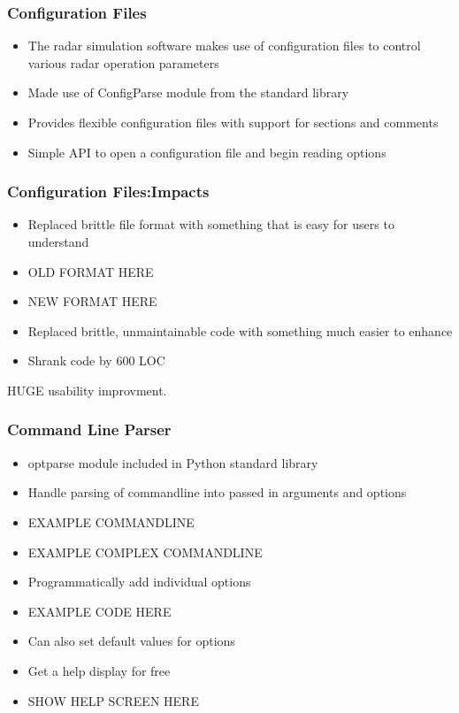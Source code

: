 \documentclass[red, hyperref={pdfpagelabels=false}]{beamer}
\begin{document}
\begin{frame}
  \frametitle{Configuration Files}
  \begin{itemize}
    \item The radar simulation software makes use of configuration files to
      control various radar operation parameters
    \item Made use of ConfigParse module from the standard library
    \item Provides flexible configuration files with support for sections and comments
    \item Simple API to open a configuration file and begin reading options
  \end{itemize}
\end{frame}

\begin{frame}
  \frametitle{Configuration Files:Impacts}
  \begin{itemize}
    \item Replaced brittle file format with something that is easy for users to understand
    \item OLD FORMAT HERE
    \item NEW FORMAT HERE
    \item Replaced brittle, unmaintainable code with something much easier to enhance
    \item Shrank code by 600 LOC
  \end{itemize}
  HUGE usability improvment.
\end{frame}

\begin{frame}
  \frametitle{Command Line Parser}
  \begin{itemize}
    \item optparse module included in Python standard library
    \item Handle parsing of commandline into passed in arguments and options
    \item EXAMPLE COMMANDLINE
    \item EXAMPLE COMPLEX COMMANDLINE
    \item Programmatically add individual options
    \item EXAMPLE CODE HERE
    \item Can also set default values for options
    \item Get a help display for free
    \item SHOW HELP SCREEN HERE
  \end{itemize}
\end{frame}
\end{document}
